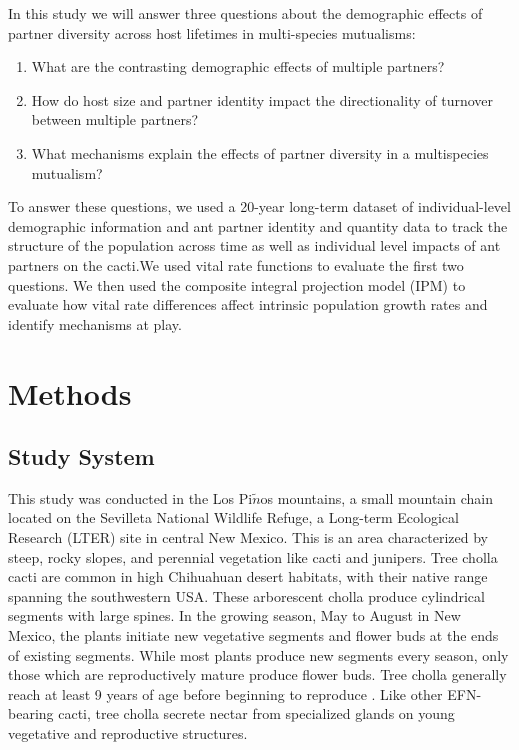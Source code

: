 \documentclass[11pt]{article}\usepackage[sc]{mathpazo} %
\begin{document}
  In this study we will answer three questions about the demographic effects of partner diversity across host lifetimes in multi-species mutualisms:
  \begin{enumerate}	
    \item{What are the contrasting demographic effects of multiple partners?}	
    \item{How do host size and partner identity impact the directionality of turnover between multiple           partners?}	
    \item{What mechanisms explain the effects of partner diversity in a multispecies mutualism?}
    \end{enumerate}
    To answer these questions, we used a 20-year long-term dataset of individual-level demographic information and ant partner identity and quantity data to track the structure of the population across time as well as individual level impacts of ant partners on the cacti.We used vital rate functions to evaluate the first two questions. We then used the composite integral projection model (IPM) to evaluate how vital rate differences affect intrinsic population growth rates and identify mechanisms at play. 
    
  \section*{Methods}
  \subsection*{Study System}
  This study was conducted in the Los Pi$\tilde{n}$os mountains, a small mountain chain located on the Sevilleta National Wildlife Refuge, a Long-term Ecological Research (LTER) site in central New Mexico.
This is an area characterized by steep, rocky slopes, and perennial vegetation like cacti and junipers. 
Tree cholla cacti are common in high Chihuahuan desert habitats, with their native range spanning the southwestern USA\cite{Benson1982}. 
These arborescent cholla produce cylindrical segments with large spines. 
In the growing season, May to August in New Mexico, the plants initiate new vegetative segments and flower buds at the ends of existing segments. 
While most plants produce new segments every season, only those which are reproductively mature produce flower buds. 
Tree cholla generally reach at least 9 years of age before beginning to reproduce \cite{Ohm2014}.
Like other EFN-bearing cacti, tree cholla secrete nectar from specialized glands on young vegetative and reproductive structures\cite{Ness2006,Oliveira1999}.
\end{document}
